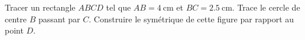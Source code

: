 
\begin{exercice}\label{exosmath-0992}

    Tracer un rectangle $ABCD$ tel que $AB = \SI{4}{\centi\meter}$ et $BC = \SI{2.5}{\centi\meter}$. Trace le cercle de centre $B$ passant par $C$. Construire le symétrique de cette figure par rapport au point $D$.

\end{exercice}
